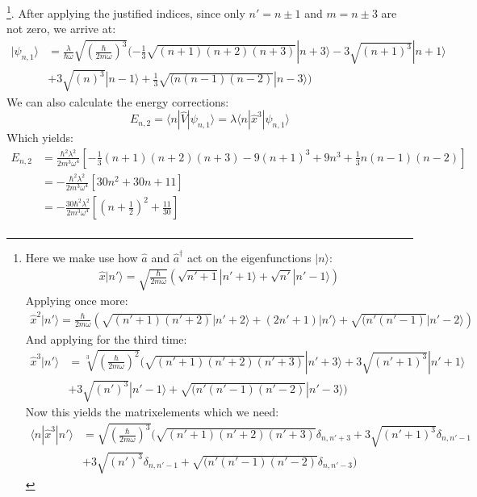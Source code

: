 \footnote{
    Here we make use how $\hat{a}$ and $\hat{a}^\dagger$ act 
    on the eigenfunctions $|n\rangle$:
\begin{align*}
    \hat{x}|n'\rangle = \sqrt{\frac{\hbar}{2m\omega}}
    \left ( \sqrt{n' + 1}|n'+1\rangle 
        + \sqrt{n'}|n' - 1 \rangle \right ) 
\end{align*}
Applying once more:
\begin{align*}
\hat{x}^2|n'\rangle = \frac{\hbar}{2m\omega}
\left ( \sqrt{(n' + 1)(n' + 2)}|n'+2\rangle 
            + (2n' + 1) |n' \rangle
            + \sqrt{(n'(n'-1)}|n' - 2 \rangle \right ) 
\end{align*}
And applying for the third time:
\begin{align*}
    \hat{x}^3|n'\rangle &= \sqrt[3]{\left (\frac{\hbar}{2m\omega}\right )^2}
( \sqrt{(n' + 1)(n' + 2)(n'+3)}|n'+3\rangle 
    + 3 \sqrt{(n'+1)^3}|n' +1 \rangle  \\
 &+ 3 \sqrt{(n')^3}|n' -1 \rangle   
            + \sqrt{(n'(n'-1)(n'-2)}|n' - 3 \rangle  ) 
\end{align*}
Now this yields the matrixelements which we need:
\begin{align}
    \langle n | \hat{x}^3 | n' \rangle &=  
    \sqrt{\left (\frac{\hbar}{2m\omega}\right)^3}
( \sqrt{(n' + 1)(n' + 2)(n'+3)}\delta_{n,n'+3} 
    + 3 \sqrt{(n'+1)^3}\delta_{n,n'-1}  \\
    &+ 3 \sqrt{(n')^3}\delta_{n,n'-1}   
    + \sqrt{(n'(n'-1)(n'-2)}\delta_{n,n'-3}  ) 
\end{align}

}. After applying the justified indices, since only $n'=n\pm 1$ and
$m = n \pm 3 $ are not zero, we arrive at:
\begin{equation}
\begin{aligned}
    |\psi_{n,1} \rangle &= \frac{\lambda}{\hbar \omega}
    \sqrt{\left(\frac{\hbar}{2m\omega}\right)^3}
    ( -\frac{1}{3}\sqrt{(n + 1)(n + 2)(n+3)}|n+3\rangle 
    - 3 \sqrt{(n+1)^3}|n +1 \rangle  \\
 &+ 3 \sqrt{(n)^3}|n -1 \rangle  
    +\frac{1}{3} \sqrt{(n(n-1)(n-2)}|n - 3 \rangle  ) 
\end{aligned}
\end{equation}
We can also calculate the energy corrections:
\begin{equation}
    E_{n,2} = \langle n | \hat{V} | \psi_{n,1} \rangle 
    = \lambda \langle n | \hat{x}^3 | \psi_{n,1} \rangle 
\end{equation}
Which yields:
\begin{equation}
\begin{aligned}
    E_{n,2} &= \frac{\hbar^2 \lambda^2}{2 m^3 \omega ^4}
    \left[-\frac{1}{3}(n+1)(n+2)(n+3)
        -9(n+1)^3 + 9n^3 + \frac{1}{3}n(n-1)(n-2)
        \right ] \\
    &= -\frac{\hbar^2 \lambda^2}{2 m^3 \omega ^4}
    \left[ 30n^2+ 30n + 11 \right ]\\
    &= -\frac{30 \hbar^2 \lambda^2}{2 m^3 \omega ^4}
    \left[\left(n + \frac{1}{2} \right)^2 + \frac{11}{30} \right ]\\
\end{aligned}
\end{equation}
